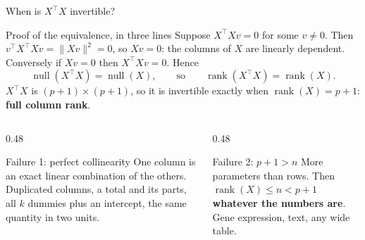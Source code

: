 \documentclass[aspectratio=169]{beamer}
\newcommand{\Xt}{X^{\!\top}}
\begin{document}
\begin{frame}[shrink=6]{When is $\Xt X$ invertible?}
  \begin{block}{Proof of the equivalence, in three lines}
    \small
    Suppose $\Xt X v = 0$ for some $v \ne 0$. Then
    $v^{\!\top}\Xt X v = \|Xv\|^2 = 0$, so $Xv = 0$: the columns of $X$ are
    linearly dependent. Conversely if $Xv = 0$ then $\Xt X v = 0$. Hence
    \[
      \operatorname{null}(\Xt X) = \operatorname{null}(X),
      \qquad\text{so}\qquad
      \operatorname{rank}(\Xt X) = \operatorname{rank}(X).
    \]
    $\Xt X$ is $(p{+}1)\times(p{+}1)$, so it is invertible exactly when
    $\operatorname{rank}(X) = p+1$: \textbf{full column rank}.
  \end{block}
  \vspace{0.2em}
  \begin{columns}[T]
    \begin{column}{0.48\textwidth}
      \begin{alertblock}{Failure 1: perfect collinearity}
        \small One column is an exact linear combination of the others.
        Duplicated columns, a total and its parts, all $k$ dummies plus an
        intercept, the same quantity in two units.
      \end{alertblock}
    \end{column}
    \begin{column}{0.48\textwidth}
      \begin{alertblock}{Failure 2: $p+1 > n$}
        \small More parameters than rows. Then
        $\operatorname{rank}(X) \le n < p+1$ \textbf{whatever the numbers
        are}. Gene expression, text, any wide table.
      \end{alertblock}
    \end{column}
  \end{columns}
\end{frame}
\end{document}
